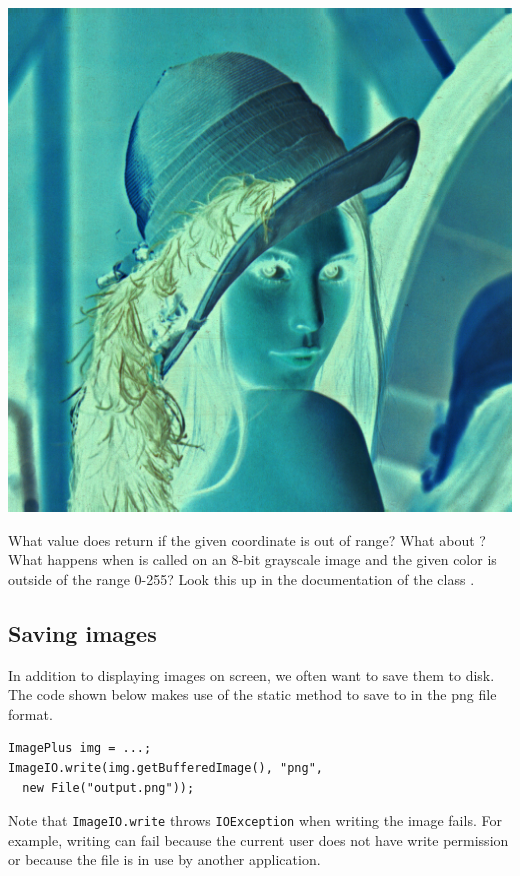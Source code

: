 \documentclass{book}
\begin{document}
\begin{exercise}
\begin{center}
\includegraphics[scale=0.2]{lena-inverted.png}
\end{center}
\end{exercise}

\begin{exercise}
What value does  return if the given coordinate is out of range? What about ? What happens when  is called on an 8-bit grayscale image and the given color is outside of the range 0-255? Look this up in the documentation of the class \href{http://rsbweb.nih.gov/ij/developer/api/ij/process/ImageProcessor.html}{}.
\end{exercise}

\subsection{Saving images}\label{sec:saving-images}
In addition to displaying images on screen, we often want to save them to disk. The code shown below makes use of the static method  to save  to  in the png file format.
\begin{lstlisting}
ImagePlus img = ...;
ImageIO.write(img.getBufferedImage(), "png", 
  new File("output.png"));
\end{lstlisting}
Note that \texttt{ImageIO.write} throws \texttt{IOException} when writing the image fails. For example, writing can fail because the current user does not have write permission or because the file is in use by another application.
\end{document}
